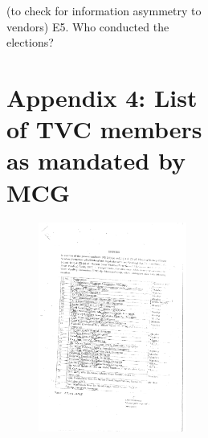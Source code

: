 \documentclass[a4paper, 12pt, twoside]{article}
\begin{document}
\begin{figure}
{\begin{figure}
\begin{figure}
\begin{mdframed}[backgroundcolor=gray!20]
       (to check for information asymmetry to vendors)
E5. Who conducted the elections?




\newpage
\section*{Appendix 4: List of TVC members as mandated by MCG}
\label{sec: Appendix 6}
\begin{figure}[h]
\centering
\includegraphics[width=5.1in]{Appendix6.pdf}
\end{figure}

\newpage

\end{mdframed}
\end{figure}
\end{figure}}
\end{figure}
\end{document}
